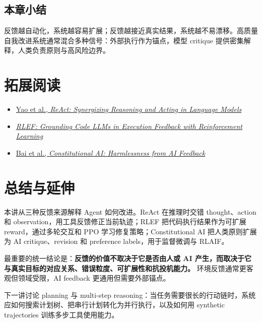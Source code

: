 \documentclass[a4paper]{article}
\begin{document}
\subsection{本章小结}

反馈越自动化，系统越容易扩展；反馈越接近真实结果，系统越不易漂移。高质量自我改进系统通常混合多种信号：外部执行作为锚点，模型 critique 提供密集解释，人类负责原则与高风险边界。

\section{拓展阅读}

\begin{itemize}
    \item \href{https://arxiv.org/abs/2210.03629}{Yao et al., \emph{ReAct: Synergizing Reasoning and Acting in Language Models}}
    \item \href{https://arxiv.org/abs/2410.02089}{\emph{RLEF: Grounding Code LLMs in Execution Feedback with Reinforcement Learning}}
    \item \href{https://arxiv.org/abs/2212.08073}{Bai et al., \emph{Constitutional AI: Harmlessness from AI Feedback}}
\end{itemize}

\section{总结与延伸}

本讲从三种反馈来源解释 Agent 如何改进。ReAct 在推理时交错 thought、action 和 observation，用工具反馈修正当前轨迹；RLEF 把代码执行结果作为可扩展 reward，通过多轮交互和 PPO 学习修复策略；Constitutional AI 把人类原则扩展为 AI critique、revision 和 preference labels，用于监督微调与 RLAIF。

最重要的统一结论是：\textbf{反馈的价值不取决于它是否由人或 AI 产生，而取决于它与真实目标的对应关系、错误粒度、可扩展性和抗投机能力。} 环境反馈通常更客观但领域受限，AI feedback 更通用但需要外部锚点。

下一讲讨论 planning 与 multi-step reasoning：当任务需要很长的行动链时，系统应如何搜索计划树、把串行计划转化为并行执行，以及如何用 synthetic trajectories 训练多步工具使用能力。
\end{document}
